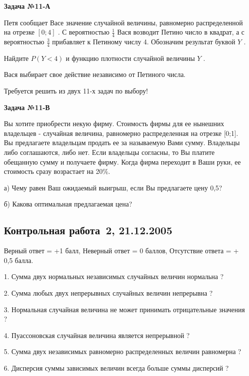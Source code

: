 \documentclass[pdftex,12pt,a4paper]{article}
\begin{document}
{\bf Задача №11}{\bf -А}

Петя сообщает Васе значение случайной величины, равномерно распределенной на отрезке  $[0;4]$ . С вероятностью  $\frac{1}{4} $  Вася возводит Петино число в квадрат, а с вероятностью  $\frac{3}{4} $  прибавляет к Петиному числу 4. Обозначим результат буквой  $Y$ .

Найдите  $P\left(Y<4\right)$  и функцию плотности случайной величины  $Y$ .

Вася выбирает свое действие независимо от Петиного числа.

Требуется решить {\bf {}} из двух 11-х задач по выбору!

{\bf Задача №11}{\bf -В}

Вы хотите приобрести некую фирму. Стоимость фирмы для ее нынешних владельцев - случайная величина, равномерно распределенная на отрезке [0;1]. Вы предлагаете владельцам продать ее за называемую Вами сумму. Владельцы либо соглашаются, либо нет. Если владельцы согласны, то Вы платите обещанную сумму и получаете фирму. Когда фирма переходит в Ваши руки, ее стоимость сразу возрастает на 20\%.

а)	Чему равен Ваш ожидаемый выигрыш, если Вы предлагаете цену 0,5?

б)	Какова оптимальная предлагаемая цена?


\subsection{Контрольная работа \No\,2, 21.12.2005}




Верный ответ = +1 балл, Неверный ответ = 0 баллов, Отсутствие ответа = + 0,5 балла.

1. Сумма двух нормальных независимых случайных величин нормальна ?

2. Сумма любых двух непрерывных случайных величин непрерывна ?

3. Нормальная случайная величина не может принимать отрицательные значения ?

4. Пуассоновская случайная величина является непрерывной ?

5. Сумма двух независимых равномерно распределенных величин равномерна ?

6. Дисперсия суммы зависимых величин всегда больше суммы дисперсий ?
\end{document}
